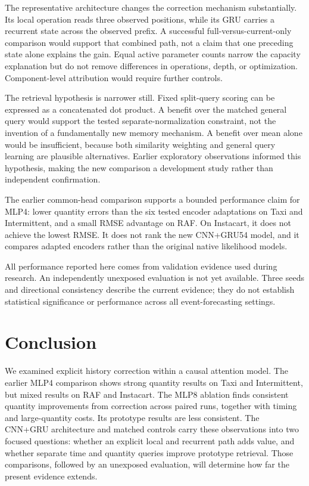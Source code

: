 \documentclass[runningheads]{llncs}
\begin{document}
The representative architecture changes the correction mechanism substantially. Its local operation reads three observed positions, while its GRU carries a recurrent state across the observed prefix. A successful full-versus-current-only comparison would support that combined path, not a claim that one preceding state alone explains the gain. Equal active parameter counts narrow the capacity explanation but do not remove differences in operations, depth, or optimization. Component-level attribution would require further controls.

The retrieval hypothesis is narrower still. Fixed split-query scoring can be expressed as a concatenated dot product. A benefit over the matched general query would support the tested separate-normalization constraint, not the invention of a fundamentally new memory mechanism. A benefit over mean alone would be insufficient, because both similarity weighting and general query learning are plausible alternatives. Earlier exploratory observations informed this hypothesis, making the new comparison a development study rather than independent confirmation.

The earlier common-head comparison supports a bounded performance claim for MLP4: lower quantity errors than the six tested encoder adaptations on Taxi and Intermittent, and a small RMSE advantage on RAF. On Instacart, it does not achieve the lowest RMSE. It does not rank the new CNN+GRU54 model, and it compares adapted encoders rather than the original native likelihood models.

All performance reported here comes from validation evidence used during research. An independently unexposed evaluation is not yet available. Three seeds and directional consistency describe the current evidence; they do not establish statistical significance or performance across all event-forecasting settings.

\section{Conclusion}
We examined explicit history correction within a causal attention model. The earlier MLP4 comparison shows strong quantity results on Taxi and Intermittent, but mixed results on RAF and Instacart. The MLP8 ablation finds consistent quantity improvements from correction across paired runs, together with timing and large-quantity costs. Its prototype results are less consistent. The CNN+GRU architecture and matched controls carry these observations into two focused questions: whether an explicit local and recurrent path adds value, and whether separate time and quantity queries improve prototype retrieval. Those comparisons, followed by an unexposed evaluation, will determine how far the present evidence extends.
\end{document}
